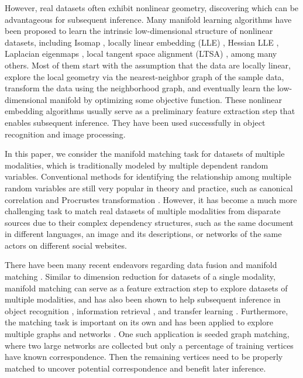 \documentclass[times,twocolumn,final]{elsarticle}
\begin{document}
However, real datasets often exhibit nonlinear geometry, discovering which can be advantageous for subsequent inference. Many manifold learning algorithms have been proposed to learn the intrinsic low-dimensional structure of nonlinear datasets, including Isomap \citep{TenenbaumSilvaLangford2000, SilvaTenenbaum2003}, locally linear embedding (LLE) \citep{SaulRoweis2000, RoweisSaul2003}, Hessian LLE \citep{DonohoGrimes2003}, Laplacian eigenmaps \citep{BelkinNiyogi2003, HeEtAl2005}, local tangent space alignment (LTSA) \citep{ZhangZha2004, ZhangWangZha2012}, among many others. Most of them start with the assumption that the data are locally linear, explore the local geometry via the nearest-neighbor graph of the sample data, transform the data using the neighborhood graph, and eventually learn the low-dimensional manifold by optimizing some objective function. These nonlinear embedding algorithms usually serve as a preliminary feature extraction step that enables subsequent inference. They have been used successfully in object recognition and image processing. 

In this paper, we consider the manifold matching task for datasets of multiple modalities, which is traditionally modeled by multiple dependent random variables. Conventional methods for identifying the relationship among multiple random variables are still very popular in theory and practice, such as canonical correlation \citep{Hotelling1936, Kettenring1971, Hardoon2004} and Procrustes transformation \citep{Sibson1978, Sibson1979, GoldbergRitov2009, GowerProcrustesBook}. However, it has become a much more challenging task to match real datasets of multiple modalities from disparate sources due to their complex dependency structures, such as the same document in different languages, an image and its descriptions, or networks of the same actors on different social websites. 

There have been many recent endeavors regarding data fusion and manifold matching \citep{LafonKellerCoifman2006, WangMahadevan2008, WangMahadevan2012, SharmaKumar2012, PriebeMarchette2012, SunPriebeTang2013, ShenSunTangPriebe2014}. Similar to dimension reduction for datasets of a single modality, manifold matching can serve as a feature extraction step to explore datasets of multiple modalities, and has also been shown to help subsequent inference in object recognition \citep{KimKittlerCipolla2007}, information retrieval \citep{SunPriebe2012}, and transfer learning \citep{PanYang2010}. Furthermore, the matching task is important on its own and has been applied to explore multiple graphs and networks \citep{LyzinskiFishkindPriebe2014, JoshuaEtAl2015, LyzinskiFishkindPriebe2016}. One such application is seeded graph matching, where two large networks are collected but only a percentage of training vertices have known correspondence. Then the remaining vertices need to be properly matched to uncover potential correspondence and benefit later inference.
\end{document}
